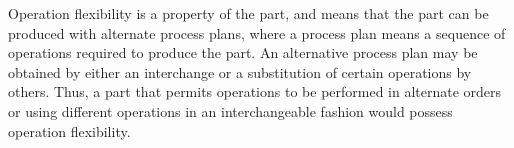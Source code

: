 Operation flexibility is a property of the part, and means that the part can be produced
with alternate process plans, where a process plan means a sequence of operations required
to produce the part. An alternative process plan may be obtained by either an interchange
or a substitution of certain operations by others. Thus, a part that permits operations to
be performed in alternate orders or using different operations in an interchangeable fashion would possess operation flexibility.

%
%
